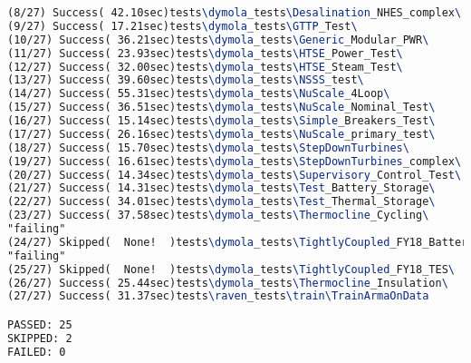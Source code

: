 \begin{lstlisting}[language=tex, basicstyle=\tiny ]
(8/27) Success( 42.10sec)tests\dymola_tests\Desalination_NHES_complex\
(9/27) Success( 17.21sec)tests\dymola_tests\GTTP_Test\
(10/27) Success( 36.21sec)tests\dymola_tests\Generic_Modular_PWR\
(11/27) Success( 23.93sec)tests\dymola_tests\HTSE_Power_Test\
(12/27) Success( 32.00sec)tests\dymola_tests\HTSE_Steam_Test\
(13/27) Success( 39.60sec)tests\dymola_tests\NSSS_test\
(14/27) Success( 55.31sec)tests\dymola_tests\NuScale_4Loop\
(15/27) Success( 36.51sec)tests\dymola_tests\NuScale_Nominal_Test\
(16/27) Success( 15.14sec)tests\dymola_tests\Simple_Breakers_Test\
(17/27) Success( 26.16sec)tests\dymola_tests\NuScale_primary_test\
(18/27) Success( 15.70sec)tests\dymola_tests\StepDownTurbines\
(19/27) Success( 16.61sec)tests\dymola_tests\StepDownTurbines_complex\
(20/27) Success( 14.34sec)tests\dymola_tests\Supervisory_Control_Test\
(21/27) Success( 14.31sec)tests\dymola_tests\Test_Battery_Storage\
(22/27) Success( 34.01sec)tests\dymola_tests\Test_Thermal_Storage\
(23/27) Success( 37.58sec)tests\dymola_tests\Thermocline_Cycling\
"failing"
(24/27) Skipped(  None!  )tests\dymola_tests\TightlyCoupled_FY18_Battery\
"failing"
(25/27) Skipped(  None!  )tests\dymola_tests\TightlyCoupled_FY18_TES\
(26/27) Success( 25.44sec)tests\dymola_tests\Thermocline_Insulation\
(27/27) Success( 31.37sec)tests\raven_tests\train\TrainArmaOnData

PASSED: 25
SKIPPED: 2
FAILED: 0
\end{lstlisting}

